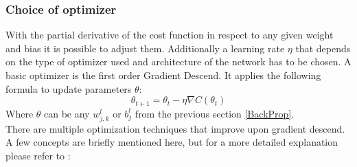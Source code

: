 			\subsubsection{Choice of optimizer}
				With the partial derivative of the cost function in respect to any given weight and bias it is possible to adjust them. Additionally a learning rate $\eta$ that depends on the type of optimizer used and architecture of the network has to be chosen. A basic optimizer is the first order Gradient Descend. It applies the following formula to update parameters $\theta$:
				\begin{equation}
					\theta_{t+1}=\theta_t - \eta \nabla C(\theta_t)
					\label{EQ:GD}
				\end{equation}
				Where $\theta$ can be any $w^l_{j,k}$ or $b^l_j$ from the previous section \ref{BackProp}.\\
				There are multiple optimization techniques that improve upon gradient descend. A few concepts are briefly mentioned here, but for a more detailed explanation please refer to \cite{NNOpti}:
